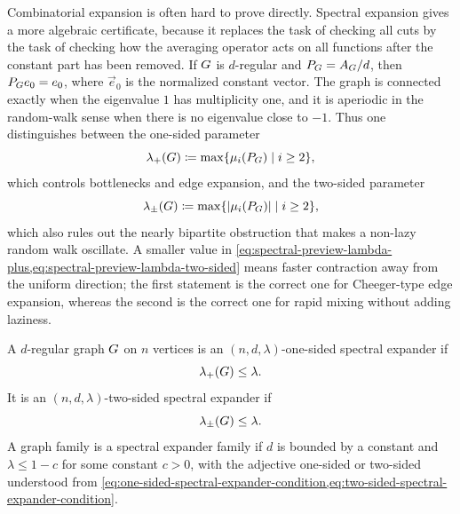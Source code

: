 Combinatorial expansion is often hard to prove directly. Spectral expansion gives a more algebraic certificate, because it replaces the task of checking all cuts by the task of checking how the averaging operator acts on all functions after the constant part has been removed. If \(G\) is \(d\)-regular and \(P_{G}=A_{G}/d\), then \(P_{G}e_0=e_0\), where \(\vec{e}_0\) is the normalized constant vector. The graph is connected exactly when the eigenvalue \(1\) has multiplicity one, and it is aperiodic in the random-walk sense when there is no eigenvalue close to \(-1\). Thus one distinguishes between the one-sided parameter
\begin{equation}
	\label{eq:spectral-preview-lambda-plus}
	\lambda_+(G)\coloneqq \max\{\mu_i(P_{G}) \mid i\geq 2\},
\end{equation}
which controls bottlenecks and edge expansion, and the two-sided parameter
\begin{equation}
	\label{eq:spectral-preview-lambda-two-sided}
	\lambda_{\pm}(G)\coloneqq \max\{\lvert\mu_i(P_{G})\rvert \mid i\geq 2\},
\end{equation}
which also rules out the nearly bipartite obstruction that makes a non-lazy random walk oscillate. A smaller value in \cref{eq:spectral-preview-lambda-plus,eq:spectral-preview-lambda-two-sided} means faster contraction away from the uniform direction; the first statement is the correct one for Cheeger-type edge expansion, whereas the second is the correct one for rapid mixing without adding laziness.

\begin{definition}
	\label{def:spectral-expander-preview}
	A \(d\)-regular graph \(G\) on \(n\) vertices is an \((n,d,\lambda)\)-one-sided spectral expander if
	\begin{equation}
		\label{eq:one-sided-spectral-expander-condition}
		\lambda_+(G)\leq \lambda.
	\end{equation}
	It is an \((n,d,\lambda)\)-two-sided spectral expander if
	\begin{equation}
		\label{eq:two-sided-spectral-expander-condition}
		\lambda_{\pm}(G)\leq \lambda.
	\end{equation}
	A graph family is a spectral expander family if \(d\) is bounded by a constant and \(\lambda\leq 1-c\) for some constant \(c>0\), with the adjective one-sided or two-sided understood from \cref{eq:one-sided-spectral-expander-condition,eq:two-sided-spectral-expander-condition}.
\end{definition}

